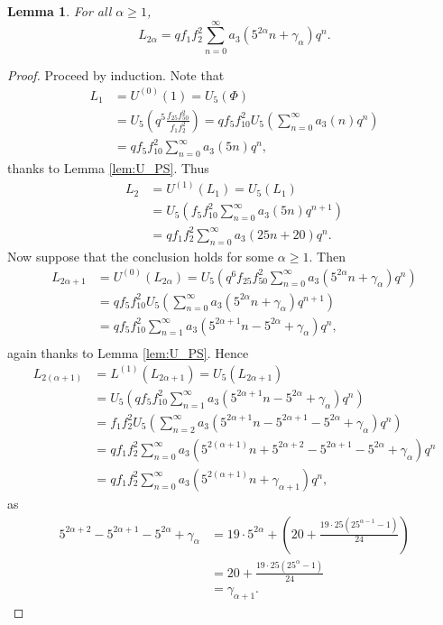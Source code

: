 \documentclass[12pt, reqno]{amsart}
\newtheorem{lem}[thm]{Lemma}
\theoremstyle{definition}
\theoremstyle{remark}
\begin{document}
\begin{lem}\label{lem:L_seq}
For all $\alpha \geq 1$,
\[L_{2\alpha} = qf_1f_2^2 \sum\limits_{n=0}^\infty a_3\left(5^{2\alpha} n + \gamma_{\alpha}\right)q^n.\]
\end{lem}
\begin{proof} 
Proceed by induction. Note that 
\begin{align*}
L_1 &= U^{(0)}(1) = U_5(\Phi) \\
&= U_5\left(q^5 \frac{f_{25}f_{50}^2}{f_1f_2^2}\right) = qf_5f_{10}^2 U_5\left(\sum\limits_{n=0}^\infty a_3(n)q^n\right) \\
&= qf_5f_{10}^2 \sum\limits_{n=0}^\infty a_3(5n)q^n,
\end{align*}
thanks to Lemma \ref{lem:U_PS}. Thus
\begin{align*}
L_2 &= U^{(1)}(L_1) = U_5(L_1) \\
&=U_5\left(f_5 f_{10}^2 \sum\limits_{n=0}^\infty a_3(5n) q^{n+1}\right) \\
&= q f_1 f_2^2 \sum\limits_{n=0}^\infty a_3(25n+20) q^n.
\end{align*}
Now suppose that the conclusion holds for some $\alpha \geq 1.$ Then
\begin{align*}
L_{2\alpha+1} &= U^{(0)}(L_{2\alpha}) = U_5\left(q^6f_{25}f_{50}^2 \sum\limits_{n=0}^\infty a_3\left(5^{2\alpha} n + \gamma_{\alpha}\right)q^n\right) \\
&= qf_5f_{10}^2 U_5\left(\sum\limits_{n=0}^\infty a_3\left(5^{2\alpha}n+\gamma_\alpha\right)q^{n+1}\right) \\
&= qf_5f_{10}^2 \sum\limits_{n=1}^\infty a_3\left(5^{2\alpha+1}n - 5^{2\alpha}+\gamma_\alpha\right) q^n, \\
\end{align*}
again thanks to Lemma \ref{lem:U_PS}. Hence
\begin{align*} 
L_{2(\alpha+1)} &= L^{(1)}(L_{2\alpha+1}) = U_5(L_{2\alpha+1}) \\
&=U_5\left(qf_5f_{10}^2 \sum\limits_{n=1}^\infty a_3\left(5^{2\alpha+1}n - 5^{2\alpha}+\gamma_\alpha\right) q^n\right) \\
&= f_1f_2^2 U_5\left(\sum\limits_{n=2}^\infty a_3\left(5^{2\alpha+1}n - 5^{2\alpha+1} - 5^{2\alpha}+\gamma_\alpha\right) q^n \right) \\
&= qf_1 f_2^2 \sum\limits_{n=0}^\infty a_3\left(5^{2(\alpha+1)}n + 5^{2\alpha+2} - 5^{2\alpha+1} - 5^{2\alpha} + \gamma_\alpha\right)q^n \\
&= qf_1f_2^2 \sum\limits_{n=0}^\infty a_3 \left(5^{2(\alpha+1)}n + \gamma_{\alpha+1}\right) q^n,
\end{align*}
as
\begin{align*}
5^{2\alpha+2} - 5^{2\alpha+1} - 5^{2\alpha} + \gamma_\alpha &=  19 \cdot 5^{2\alpha} + \left(20 + \frac{19 \cdot 25(25^{\alpha-1}-1)}{24}\right) \\
&= 20 + \frac{19 \cdot 25(25^{\alpha}-1)}{24} \\
&= \gamma_{\alpha+1}.
\end{align*}
\end{proof}
\end{document}
